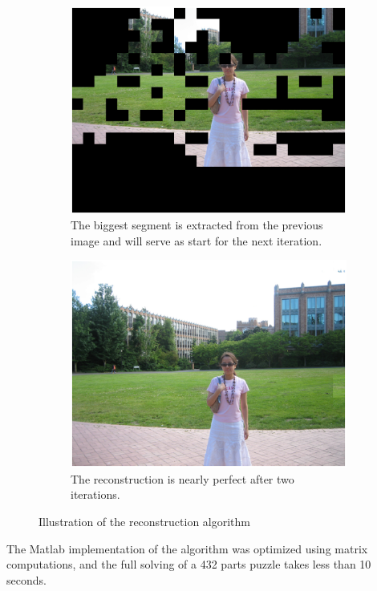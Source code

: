 \begin{figure}[H]
    \begin{subfigure}[b]{0.25\textheight}
        \centering
        \includegraphics[width=\textwidth]{fig/algo_cut.eps}
        \caption{The biggest segment is extracted from the previous image and will serve as start for the next iteration.}    
        \label{fig:placement3}
    \end{subfigure}%
    
    \begin{subfigure}[b]{0.25\textheight}
        \centering
        \includegraphics[width=\textwidth]{fig/algo_fin2.eps}
        \caption{The reconstruction is nearly perfect after two iterations.}    
        \label{fig:placement4}
    \end{subfigure}
    
    \caption{Illustration of the reconstruction algorithm}
    \label{fig:placement}
\end{figure}

The Matlab implementation of the algorithm was optimized using matrix computations, and the full solving of a 432 parts puzzle takes less than 10 seconds.